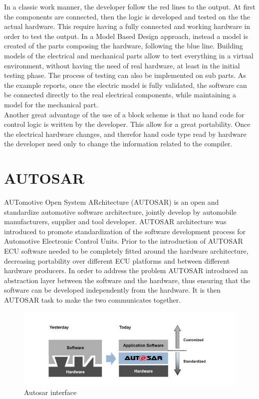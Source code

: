 \documentclass[../main.tex]{subfiles}
\begin{document}
In a classic work manner, the developer follow the red lines to the output. At first the components are connected, then the logic is developed and tested on the the actual hardware. This require having a fully connected and working hardware in order to test the output. In a Model Based Design approach, instead a model is created of the parts composing the hardware, following the blue line. Building models of the electrical and mechanical parts allow to test everything in a virtual environment, without having the need of real hardware, at least in the initial testing phase. The process of testing can also be implemented on sub parts. As the example reports, once the electric model is fully validated, the software can be connected directly to the real electrical components, while maintaining a model for the mechanical part.\\
Another great advantage of the use of a block scheme is that no hand code for control logic is written by the developer. This allow for a great portability. Once the electrical hardware changes, and therefor hand code type read by hardware the developer need only to change the information related to the compiler. 
\section{AUTOSAR}
AUTomotive Open System ARchitecture (\gls{AUTOSAR}) is an open and standardize automotive software architecture, jointly develop by automobile manufacturers, supplier and tool developer. \gls{AUTOSAR} architecture was introduced to promote standardization of the software development process for Automotive Electronic Control Units. Prior to the introduction of \gls{AUTOSAR} \gls{ECU} software needed to be completely fitted around the hardware architecture, decreasing portability over different \gls{ECU} platforms and between different hardware producers. 
In order to address the problem \gls{AUTOSAR} introduced an abstraction layer between the software and the hardware, thus ensuring that the software can be developed independently from the hardware. It is then \gls{AUTOSAR} task to make the two communicates together.
\begin{figure}[h]
    \centering
    \includegraphics[width=\linewidth]{images_folder/autosarcapture.jpg}
    \caption{Autosar interface}
    \label{fig:AUTCA}
\end{figure}
\end{document}

